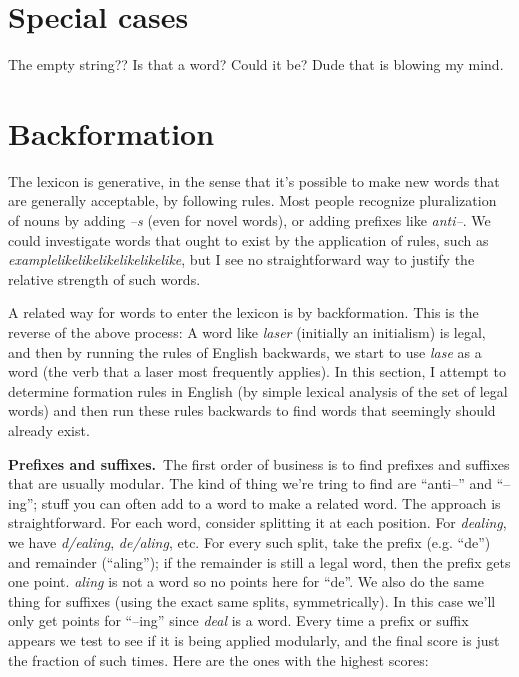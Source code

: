 \documentclass[twocolumn]{article}
\begin{document}
\section{Special cases}

The empty string?? Is that a word? Could it be? Dude that is blowing my mind.

\section{Backformation} \label{sec:backformation}

The lexicon is generative, in the sense that it's possible to make new
words that are generally acceptable, by following rules. Most people
recognize pluralization of nouns by adding {\it --s} (even for novel
words), or adding prefixes like {\it anti--}. We could investigate
words that ought to exist by the application of rules, such as {\it
  examplelikelikelikelikelikelike}, but I see no straightforward way
to justify the relative strength of such words.

A related way for words to enter the lexicon is by backformation. This
is the reverse of the above process: A word like {\it laser}
(initially an initialism) is legal, and then by running the rules of
English backwards, we start to use {\it lase} as a word (the verb
that a laser most frequently applies). In this section, I attempt
to determine formation rules in English (by simple lexical analysis
of the set of legal words) and then run these rules backwards to find
words that seemingly should already exist.

{\bf Prefixes and suffixes.}\ The first order of business is to find
prefixes and suffixes that are usually modular. The kind of thing
we're tring to find are ``anti--'' and ``--ing''; stuff you can often
add to a word to make a related word. The approach is straightforward.
For each word, consider splitting it at each position. For {\it dealing},
we have {\it d/ealing}, {\it de/aling}, etc. For every such split,
take the prefix (e.g. ``de'') and remainder (``aling''); if the remainder
is still a legal word, then the prefix gets one point. {\it aling} is not
a word so no points here for ``de''. We also do the same thing for suffixes
(using the exact same splits, symmetrically). In this case we'll only get
points for ``--ing'' since {\it deal} is a word. Every time a prefix or
suffix appears we test to see if it is being applied modularly, and
the final score is just the fraction of such times. Here are the ones with
the highest scores:
\end{document}
